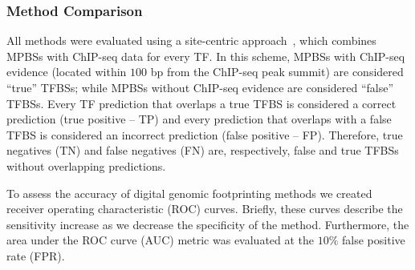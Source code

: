 \documentclass[11pt]{article}
\begin{document}
\subsubsection{Method Comparison}
\label{sec:performeval}

All methods were evaluated using a site-centric approach~\citep{cuellar2012}, which combines MPBSs with ChIP-seq data for every TF. In this scheme, MPBSs with ChIP-seq evidence (located within $100$ bp from the ChIP-seq peak summit) are considered ``true'' TFBSs; while MPBSs without ChIP-seq evidence are considered ``false'' TFBSs. Every TF prediction that overlaps a true TFBS is considered a correct prediction (true positive -- TP) and every prediction that overlaps with a false TFBS is considered an incorrect prediction (false positive -- FP). Therefore, true negatives (TN) and false negatives (FN) are, respectively, false and true TFBSs without overlapping predictions.

To assess the accuracy of digital genomic footprinting methods we created receiver operating characteristic (ROC) curves. Briefly, these curves describe the sensitivity increase as we decrease the specificity of the method. Furthermore, the area under the ROC curve (AUC) metric was evaluated at the $10\%$ false positive rate (FPR). {\color{red!50!black}{ Segmentation-based approaches (Boyle, DNase2TF, HINT, Neph and Wellington) provide footprint predictions that do not necessarily encompass all MPBSs. To create full ROC curves for these methods, we first ranked all predicted sites by their DNase I cleavage tag count followed all non-predicted sites ranked by their tag count. In order to present a fair comparison, this approach was also applied to all site-centric methods (Centipede, Cuellar, FLR and PIQ). For that, we considered a probability threshold of $0.9$ for detection of footprint on all site-centric methods.

}}
\end{document}

